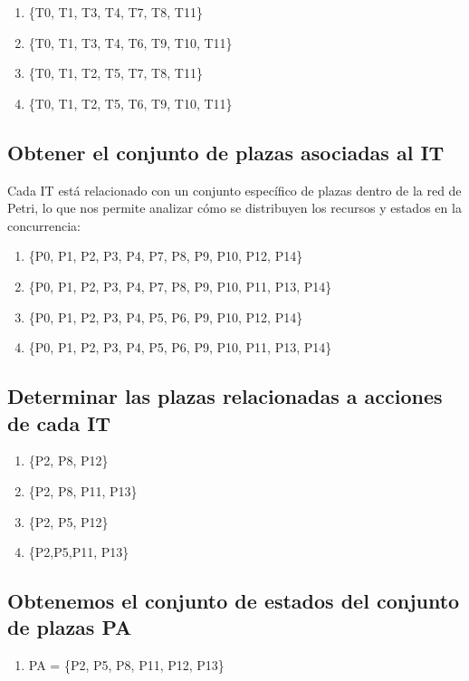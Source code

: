 \documentclass[12pt]{article}
\begin{document}
\begin{enumerate}
    \item \{T0, T1, T3, T4, T7, T8, T11\}
    \item \{T0, T1, T3, T4, T6, T9, T10, T11\}
    \item \{T0, T1, T2, T5, T7, T8, T11\}
    \item \{T0, T1, T2, T5, T6, T9, T10, T11\}
\end{enumerate}

\subsection{ Obtener el conjunto de plazas asociadas al IT}

Cada IT está relacionado con un conjunto específico de plazas dentro de la red de Petri, lo que nos permite analizar cómo se distribuyen los recursos y estados en la concurrencia:

\begin{enumerate}
    \item \{P0, P1, P2, P3, P4, P7, P8, P9, P10, P12, P14\}
    \item \{P0, P1, P2, P3, P4, P7, P8, P9, P10, P11, P13, P14\}
    \item \{P0, P1, P2, P3, P4, P5, P6, P9, P10, P12, P14\}
    \item \{P0, P1, P2, P3, P4, P5, P6, P9, P10, P11, P13, P14\}
\end{enumerate}

\subsection{ Determinar las plazas relacionadas a acciones de cada IT}

\begin{enumerate}
    \item \{P2, P8, P12\}
    \item \{P2, P8, P11, P13\}
    \item \{P2, P5, P12\}
    \item \{P2,P5,P11, P13\}
\end{enumerate}

\subsection{  Obtenemos el conjunto de estados del conjunto de plazas PA}
\begin{enumerate}
    \item PA = \{P2, P5, P8, P11, P12, P13\}
\end{enumerate}
\end{document}
